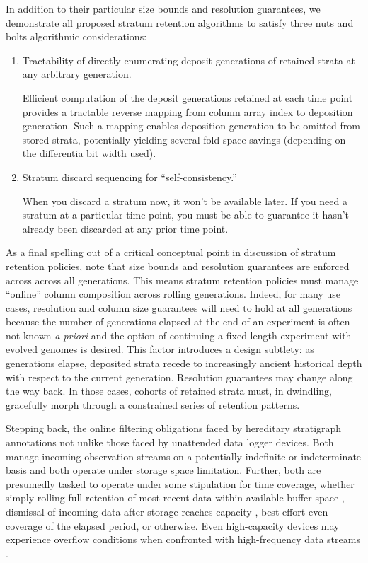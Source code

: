 In addition to their particular size bounds and resolution guarantees, we demonstrate all proposed stratum retention algorithms to satisfy three nuts and bolts algorithmic considerations:
\begin{enumerate}
\item Tractability of directly enumerating deposit generations of retained strata at any arbitrary generation.

  Efficient computation of the deposit generations retained at each time point provides a tractable reverse mapping from column array index to deposition generation.
  Such a mapping enables deposition generation to be omitted from stored strata, potentially yielding several-fold space savings (depending on the differentia bit width used).

\item Stratum discard sequencing for ``self-consistency.''

  When you discard a stratum now, it won't be available later.
  If you need a stratum at a particular time point, you must be able to guarantee it hasn't already been discarded at any prior time point.

\end{enumerate}

As a final spelling out of a critical conceptual point in discussion of stratum retention policies, note that size bounds and resolution guarantees are enforced across across all generations.
This means stratum retention policies must manage ``online'' column composition across rolling generations.
Indeed, for many use cases, resolution and column size guarantees will need to hold at all generations because the number of generations elapsed at the end of an experiment is often not known \textit{a priori} and the option of continuing a fixed-length experiment with evolved genomes is desired.
This factor introduces a design subtlety: as generations elapse, deposited strata recede to increasingly ancient historical depth with respect to the current generation.
Resolution guarantees may change along the way back.
In those cases, cohorts of retained strata must, in dwindling, gracefully morph through a constrained series of retention patterns.

Stepping back, the online filtering obligations faced by hereditary stratigraph annotations not unlike those faced by unattended data logger devices.
Both manage incoming observation streams on a potentially indefinite or indeterminate basis and both operate under storage space limitation.
Further, both are presumedly tasked to operate under some stipulation for time coverage, whether simply rolling full retention of most recent data within available buffer space \citep{fincham1995use}, dismissal of incoming data after storage reaches capacity \citep{saunders1989portable,mahzan2017design}, best-effort even coverage of the elapsed period, or otherwise.
Even high-capacity devices may experience overflow conditions when confronted with high-frequency data streams \citep{luharuka2003design}.

